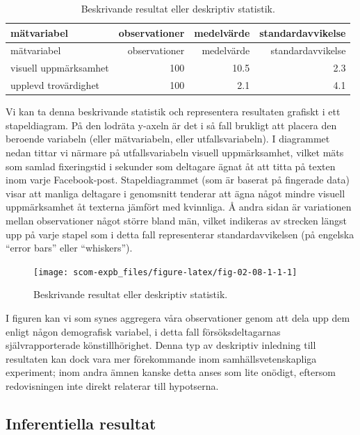 \documentclass[
]{book}
\begin{document}
\begin{longtable}[]{@{}lrrr@{}}
\caption{\label{tab:tab-02-08-1-1}Beskrivande resultat eller deskriptiv statistik.}\tabularnewline
\toprule
mätvariabel & observationer & medelvärde & standardavvikelse\tabularnewline
\midrule
\endfirsthead
\toprule
mätvariabel & observationer & medelvärde & standardavvikelse\tabularnewline
\midrule
\endhead
visuell uppmärksamhet & 100 & 10.5 & 2.3\tabularnewline
upplevd trovärdighet & 100 & 2.1 & 4.1\tabularnewline
\bottomrule
\end{longtable}

Vi kan ta denna beskrivande statistik och representera resultaten grafiskt i ett stapeldiagram. På den lodräta y-axeln är det i så fall brukligt att placera den beroende variabeln (eller mätvariabeln, eller utfallsvariabeln). I diagrammet nedan tittar vi närmare på utfallsvariabeln visuell uppmärksamhet, vilket mäts som samlad fixeringstid i sekunder som deltagare ägnat åt att titta på texten inom varje Facebook-post. Stapeldiagrammet (som är baserat på fingerade data) visar att manliga deltagare i genomsnitt tenderar att ägna något mindre visuell uppmärksamhet åt texterna jämfört med kvinnliga. Å andra sidan är variationen mellan observationer något större bland män, vilket indikeras av strecken längst upp på varje stapel som i detta fall representerar standardavvikelsen (på engelska ``error bars'' eller ``whiskers'').

\begin{figure}

{\centering \texttt{[image: scom-expb\_files/figure-latex/fig-02-08-1-1-1]} 

}

\caption{Beskrivande resultat eller deskriptiv statistik.}\label{fig:fig-02-08-1-1}
\end{figure}

I figuren kan vi som synes aggregera våra observationer genom att dela upp dem enligt någon demografisk variabel, i detta fall försöksdeltagarnas självrapporterade könstillhörighet. Denna typ av deskriptiv inledning till resultaten kan dock vara mer förekommande inom samhällsvetenskapliga experiment; inom andra ämnen kanske detta anses som lite onödigt, eftersom redovisningen inte direkt relaterar till hypotserna.

\hypertarget{sub08.1.2}{%
\subsection{Inferentiella resultat}\label{sub08.1.2}}
\end{document}

